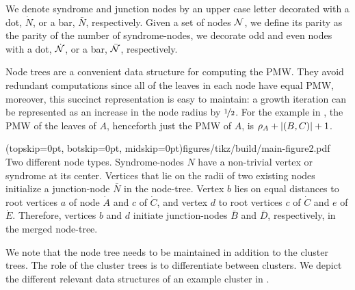 We denote syndrome and junction nodes by an upper case letter decorated with a dot, $\dot{N}$, or a bar, $\bar{N}$, respectively. Given a set of nodes $\mathcal{N}$, we define its parity as the parity of the number of syndrome-nodes, we decorate odd and even nodes with a dot, $\dot{\mathcal{N}}$, or a bar, $\bar{\mathcal{N}}$, respectively.


Node trees are a convenient data structure for computing the PMW. %
They avoid redundant computations since all of the leaves in each node have equal PMW, moreover, this succinct representation is easy to maintain:
a growth iteration can be represented as an increase in the node radius by $\nicefrac{1}{2}$. For the example in , the PMW of the leaves of $A$, henceforth just the PMW of $A$, is $\rho_A + \lvert(B,C)\rvert +1$. %

\Figure[bt](topskip=0pt, botskip=0pt, midskip=0pt){figures/tikz/build/main-figure2.pdf}{
Two different node types. Syndrome-nodes $N$ have a non-trivial vertex or syndrome at its center. Vertices that lie on the radii of two existing nodes initialize a junction-node $\bar{N}$ in the node-tree. Vertex $b$ lies on equal distances to root vertices $a$ of node $\dot{A}$ and $c$ of $\dot{C}$, and vertex $d$ to root vertices $c$ of $\dot{C}$ and $e$ of $\dot{E}$. Therefore, vertices $b$ and $d$ initiate junction-nodes $\bar{B}$ and $\bar{D}$, respectively, in the merged node-tree. \label{fig:nodes}}

We note that the node tree needs to be maintained in addition to the cluster trees. The role of the cluster trees is to differentiate between clusters.
We depict the different relevant data structures %
of an example cluster in . %

